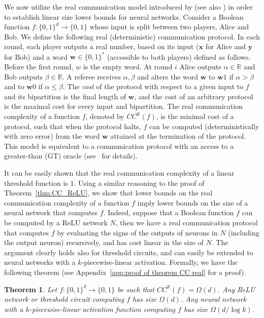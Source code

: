\documentclass[11pt]{article}
\newtheorem{theorem}{Theorem}[section]
\newcommand{\bx}{\mathbf{x}}
\newcommand{\bw}{\mathbf{w}}
\newcommand{\by}{\mathbf{y}}
\begin{document}
We now utilize the real communication model introduced by \cite{kraivcek1998interpolation} (see also \cite{de2016limited}) in order to establish linear size lower bounds for neural networks.
Consider a Boolean function $f:\{0,1\}^d \rightarrow \{0,1\}$ whose input is split between two players, Alice and Bob. 
We define the following real (deterministic) communication protocol. In each round, each player outputs a real number, based on its input ($\bx$ for Alice and $\by$ for Bob) and a word $\bw \in \{0,1\}^*$ (accessible to both players) defined as follows. Before the first round, $w$ is the empty word. At round $i$ Alice outputs $\alpha \in \mathbb{R}$ and Bob outputs $\beta \in \mathbb{R}$. A referee receives $\alpha, \beta$ and alters the word $\bw$ to $\bw 1$ if $\alpha > \beta$ and to $\bw 0$ if $\alpha \leq \beta$. The \emph{cost} of the protocol with respect to a given input to $f$ and its bipartition is the final length of $\bw$, and the cost of an arbitrary protocol is the maximal 
cost
for every input and bipartition. 
The real communication complexity of a function $f$, denoted by $CC^{\mathbb{R}}(f)$, is the minimal cost of a protocol, such that when the protocol halts, $f$ can be computed (deterministically with zero error) from the word $\bw$ attained at the termination of the protocol. This model is equivalent to a communication protocol with an access to a greater-than (GT) oracle (see~\cite{chattopadhyay2019equality} for details).

It can be easily shown that the real communication complexity of a linear threshold function is $1$. Using a similar reasoning to the proof of Theorem~\ref{thm:CC_ReLU}, we show that lower bounds on the real communication complexity of a function $f$ imply lower bounds on the size of a neural network that computes $f$.
Indeed, suppose that a Boolean function $f$ can be computed by a ReLU network $N$, then we have a real communication protocol that computes $f$ by evaluating the signs of the outputs of neurons in $N$ (including the output neuron) recursively, and has cost linear in the size of $N$. The argument clearly holds also for threshold circuits, and can easily be extended to neural networks with a $k$-piecewise-linear activation.
Formally, we have the following theorem (see Appendix~\ref{app:proof of theorem CC real} for a proof).
\begin{theorem}
\label{thm:CC_real}
    Let $f:\{0,1\}^d \rightarrow \{0,1\}$ be such that $CC^{\mathbb{R}}(f)=\Omega(d)$.
    Any ReLU network or threshold circuit computing $f$ has size $\Omega(d)$.
	Any neural network with a $k$-piecewise-linear activation function computing $f$ has size $\Omega(d/\log k)$. 
\end{theorem}
\end{document}
